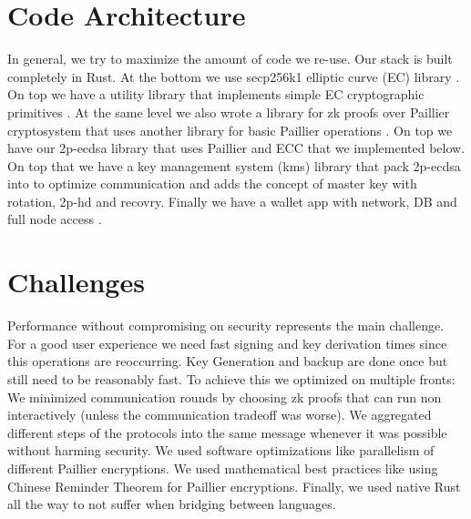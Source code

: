 \documentclass[runningheads]{llncs}
\begin{document}
\section{Code Architecture}
In general, we try to maximize the amount of code we re-use. Our stack is built completely in Rust. At the bottom we use secp256k1 elliptic curve (EC) library \cite{secp}. On top we have a utility library that implements simple EC cryptographic primitives \cite{curv}. At the same level we also wrote a library for zk proofs over Paillier cryptosystem \cite{zk-paillier} that uses another library for basic Paillier operations \cite{paillier}. On top we have our 2p-ecdsa library \cite{ecdsa} that uses Paillier and ECC that we implemented below. On top that we have a key management system (kms) library \cite{kms} that pack 2p-ecdsa into to optimize communication and adds the concept of master key with rotation, 2p-hd and recovry. Finally we have a wallet app with network, DB and full node access \cite{gotham}.

\section{Challenges}
Performance without compromising on security represents the main challenge. For a good user experience we need fast signing and key derivation times since this operations are reoccurring. Key Generation and backup are done once but still need to be reasonably fast. To achieve this we optimized on multiple fronts:  We minimized communication rounds by choosing zk proofs that can run non interactively (unless the communication tradeoff was worse). We aggregated different steps of the protocols into the same message whenever it was possible without harming security. We used software optimizations like parallelism of different Paillier encryptions. We used mathematical best practices like using Chinese Reminder Theorem for Paillier encryptions. Finally, we used native Rust all the way to not suffer when bridging between languages.
\end{document}
